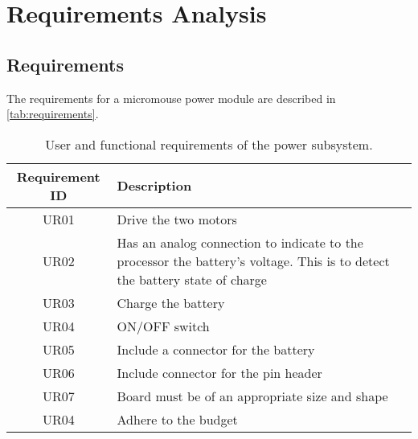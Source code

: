 \documentclass[class=report,11pt,crop=false]{standalone}
\begin{document}
\chapter{Requirements Analysis} \label{ch:reqAnalysis}
\vspace{-1cm}

\section{Requirements}
The requirements for a micromouse power module are described in \autoref{tab:requirements}.
\begin{table}[h]
    \centering
    \caption{User and functional requirements of the power subsystem.}    \label{tab:requirements}
    \begin{tabular}{|c|m{12cm}|}
        \hline
        \textbf{ Requirement ID} & \textbf{Description} \\
        \hline
         UR01 & Drive the two motors\\
         \hline
         UR02 & Has an analog connection to indicate to the processor the battery's voltage. This is to detect the battery state of charge \\
         \hline
         UR03 & Charge the battery\\
         \hline
         UR04 & ON/OFF switch \\
         \hline
         UR05 & Include a connector for the battery \\
         \hline
         UR06 & Include connector for the pin header \\
         \hline
         UR07 & Board must be of an appropriate size and shape \\
         \hline
         UR04 & Adhere to the budget \\
         \hline
    \end{tabular}
\end{table}

\end{document}
